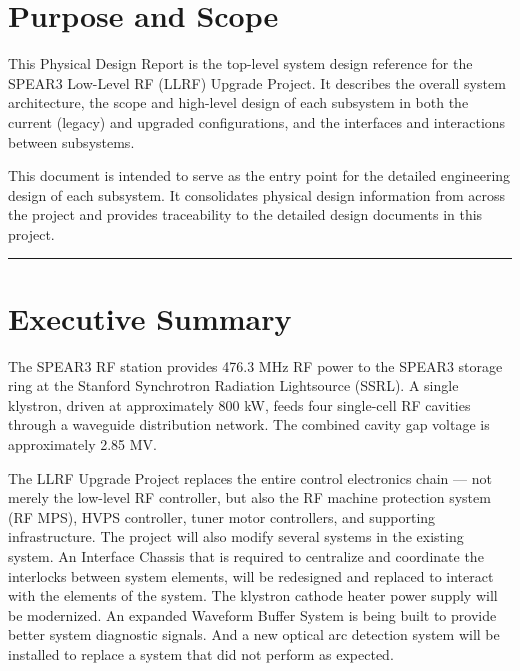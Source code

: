 %
%
\section*{Purpose and Scope}\label{sec:purpose}

This Physical Design Report is the top-level system design reference for the SPEAR3 Low-Level RF (LLRF) Upgrade Project. It describes the overall system architecture, the scope and high-level design of each subsystem in both the current (legacy) and upgraded configurations, and the interfaces and interactions between subsystems.

This document is intended to serve as the entry point for the detailed engineering design of each subsystem. It consolidates physical design information from across the project and provides traceability to the detailed design documents in this project.

\begin{center}\rule{0.5\linewidth}{0.5pt}\end{center}

\section{Executive Summary}\label{executive-summary}

The SPEAR3 RF station provides 476.3 MHz RF power to the SPEAR3 storage ring at the Stanford Synchrotron Radiation Lightsource (SSRL). A single klystron, driven at approximately 800 kW, feeds four single-cell RF cavities through a waveguide distribution network. The combined cavity gap voltage is approximately 2.85 MV.

The LLRF Upgrade Project replaces the entire control electronics chain --- not merely the low-level RF controller, but also the RF machine protection system (RF MPS), HVPS controller, tuner motor controllers, and supporting infrastructure. The project will also modify several systems in the existing system. An Interface Chassis that is required to centralize and coordinate the interlocks between system elements, will be redesigned and replaced to interact with the elements of the system. The klystron cathode heater power supply will be modernized. An expanded Waveform Buffer System is being built to provide better system diagnostic signals. And a new optical arc detection system will be installed to replace a system that did not perform as expected.

